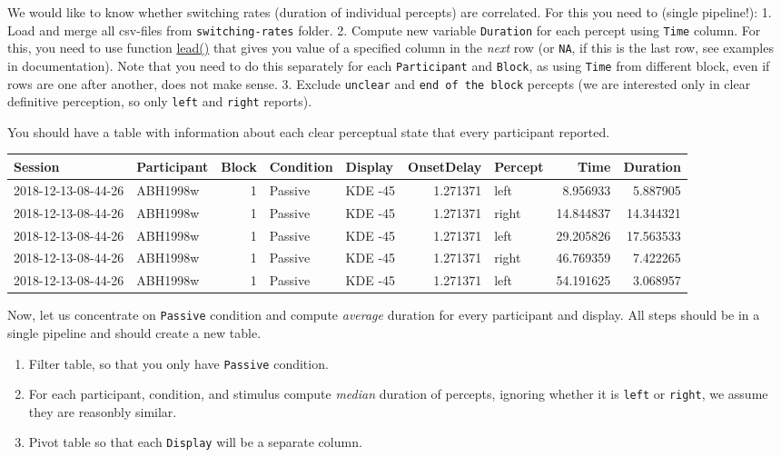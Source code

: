 \documentclass[
]{book}
\providecommand{\tightlist}{%
  \setlength{\itemsep}{0pt}\setlength{\parskip}{0pt}}
\begin{document}
We would like to know whether switching rates (duration of individual percepts) are correlated. For this you need to (single pipeline!):
1. Load and merge all csv-files from \texttt{switching-rates} folder.
2. Compute new variable \texttt{Duration} for each percept using \texttt{Time} column. For this, you need to use function \href{https://dplyr.tidyverse.org/reference/lead-lag.html}{lead()} that gives you value of a specified column in the \emph{next} row (or \texttt{NA}, if this is the last row, see examples in documentation). Note that you need to do this separately for each \texttt{Participant} and \texttt{Block}, as using \texttt{Time} from different block, even if rows are one after another, does not make sense.
3. Exclude \texttt{unclear} and \texttt{end\ of\ the\ block} percepts (we are interested only in clear definitive perception, so only \texttt{left} and \texttt{right} reports).

You should have a table with information about each clear perceptual state that every participant reported.

\begin{tabular}{l|l|r|l|l|r|l|r|r}
\hline
Session & Participant & Block & Condition & Display & OnsetDelay & Percept & Time & Duration\\
\hline
2018-12-13-08-44-26 & ABH1998w & 1 & Passive & KDE -45 & 1.271371 & left & 8.956933 & 5.887905\\
\hline
2018-12-13-08-44-26 & ABH1998w & 1 & Passive & KDE -45 & 1.271371 & right & 14.844837 & 14.344321\\
\hline
2018-12-13-08-44-26 & ABH1998w & 1 & Passive & KDE -45 & 1.271371 & left & 29.205826 & 17.563533\\
\hline
2018-12-13-08-44-26 & ABH1998w & 1 & Passive & KDE -45 & 1.271371 & right & 46.769359 & 7.422265\\
\hline
2018-12-13-08-44-26 & ABH1998w & 1 & Passive & KDE -45 & 1.271371 & left & 54.191625 & 3.068957\\
\hline
\end{tabular}

Now, let us concentrate on \texttt{Passive} condition and compute \emph{average} duration for every participant and display. All steps should be in a single pipeline and should create a new table.

\begin{enumerate}
\def\labelenumi{\arabic{enumi}.}
\tightlist
\item
  Filter table, so that you only have \texttt{Passive} condition.
\item
  For each participant, condition, and stimulus compute \emph{median} duration of percepts, ignoring whether it is \texttt{left} or \texttt{right}, we assume they are reasonbly similar.
\item
  Pivot table so that each \texttt{Display} will be a separate column.
\end{enumerate}
\end{document}
